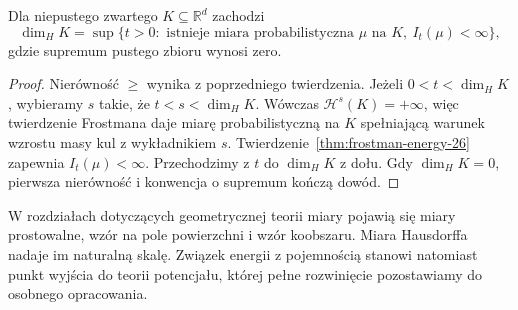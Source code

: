 \begin{wniosek}
\label{cor:energy-dimension-26}
Dla niepustego zwartego $K\subseteq\mathbb R^d$ zachodzi
\[
 \dim_H K=\sup\{t>0:\text{ istnieje miara probabilistyczna }
 \mu\text{ na }K,\ I_t(\mu)<\infty\},
\]
gdzie supremum pustego zbioru wynosi zero.
\end{wniosek}
\begin{proof}
Nierówność $\ge$ wynika z poprzedniego twierdzenia.
Jeżeli $0<t<\dim_H K$, wybieramy $s$ takie, że
$t<s<\dim_H K$. Wówczas $\mathcal H^s(K)=+\infty$,
więc twierdzenie Frostmana daje miarę probabilistyczną
na $K$ spełniającą warunek wzrostu masy kul z wykładnikiem
$s$. Twierdzenie~\ref{thm:frostman-energy-26}
zapewnia $I_t(\mu)<\infty$. Przechodzimy z $t$ do
$\dim_H K$ z dołu. Gdy $\dim_H K=0$, pierwsza
nierówność i konwencja o supremum kończą dowód.
\end{proof}

\begin{uwaga}
W rozdziałach dotyczących geometrycznej teorii miary
pojawią się miary prostowalne, wzór na pole powierzchni
i wzór koobszaru. Miara Hausdorffa nadaje im naturalną
skalę. Związek energii z pojemnością stanowi natomiast
punkt wyjścia do teorii potencjału, której pełne
rozwinięcie pozostawiamy do osobnego opracowania.
\end{uwaga}
